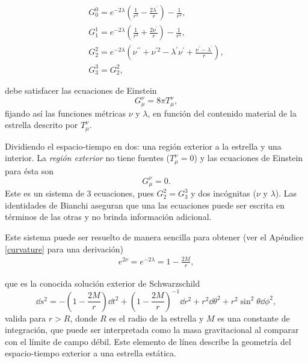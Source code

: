 \begin{equation}
    \begin{array} { l } { G _ { 0 } ^ { 0 } = e ^ { - 2 \lambda } \left( \frac { 1 } { r ^ { 2 } } - \frac { 2 \lambda ^ { \prime } } { r } \right) - \frac { 1 } { r ^ { 2 } }  }, \\ { G _ { 1 } ^ { 1 } = e ^ { - 2 \lambda } \left( \frac { 1 } { r ^ { 2 } } + \frac { 2 \nu ^ { \prime } } { r } \right) - \frac { 1 } { r ^ { 2 } } }, \\ { G _ { 2 } ^ { 2 } = e ^ { - 2 \lambda } \left( \nu ^ { \prime \prime } + \nu ^ { \prime 2 } - \lambda ^ { \prime } \nu ^ { \prime } + \frac { \nu ^ { \prime } - \lambda ^ { \prime } } { r } \right)  }, \\ { G _ { 3 } ^ { 3 } = G _ { 2 } ^ { 2 }  }, \end{array}
    \label{eee}
\end{equation}

debe satisfacer las ecuaciones de Einstein
\begin{equation}
    G _ { \mu } ^ { \nu }  = 8 \pi T _ { \mu } ^ { \nu },
\end{equation}
fijando así las funciones métricas $\nu$ y $\lambda$, en función del contenido material de la estrella descrito por $T _ { \mu } ^ { \nu }$.

Dividiendo el espacio-tiempo en dos: una región exterior a la estrella y una interior. 
La \textit{región exterior} no tiene fuentes ($T _ { \mu } ^ { \nu }=0$) y las ecuaciones de Einstein para ésta son 
\begin{equation}
    G _ { \mu } ^ { \nu } = 0.
\end{equation}
Este es un sistema de 3 ecuaciones, pues $ G _ { 2 } ^ { 2}=G _ { 3 } ^ { 3}$ y dos incógnitas ($\nu$ y $\lambda$). Las identidades de Bianchi aseguran que una las ecuaciones puede ser escrita en términos de las otras y no brinda información adicional.

Este sistema puede ser resuelto de manera sencilla para obtener (ver el Apéndice \ref{curvature} para una derivación)
\begin{align}
    e^{2\nu}=e^{-2\lambda}=1-\frac{2 M}{r},
\end{align}


que es la conocida solución exterior de Schwarzschild
\begin{equation}
    \dd{s} ^ { 2 } = - \left( 1 - \frac { 2 M } { r } \right) \dd{t} ^ { 2 } + \left( 1 - \frac { 2 M } { r } \right) ^ { - 1 } \dd{r} ^ { 2 }  + r ^ { 2 } \dd{\theta} ^ { 2 } + r ^ { 2 } \sin ^ { 2 } \theta \dd{\phi} ^ { 2 }, \label{schwarzs}
\end{equation}
valida para $r>R$, donde $R$ es el radio de la estrella y $M$ es una constante de integración, que puede ser interpretada como la masa gravitacional al comparar con el límite de campo débil. Este elemento de línea describe la geometría del espacio-tiempo exterior a una estrella estática.

